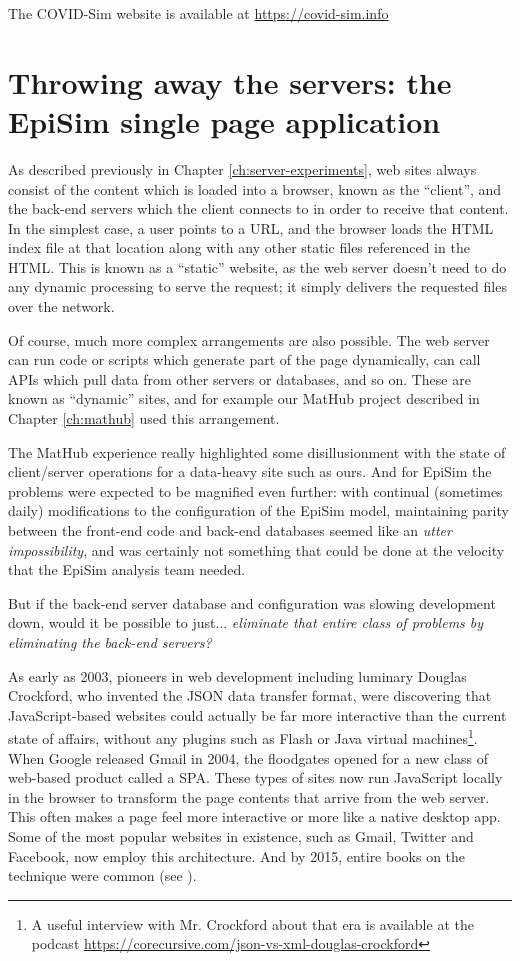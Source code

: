 The COVID-Sim website is available at \url{https://covid-sim.info}

\hypertarget{covid-throw-away-the-servers}{%
\section{Throwing away the servers: the EpiSim single page application}\label{covid-throw-away-the-servers}}

As described previously in Chapter \ref{ch:server-experiments}, web sites always consist of the content which is loaded into a browser, known as the ``client'', and the back-end servers which the client connects to in order to receive that content. In the simplest case, a user points to a URL, and the browser loads the HTML index file at that location along with any other static files referenced in the HTML. This is known as a ``static'' website, as the web server doesn't need to do any dynamic processing to serve the request; it simply delivers the requested files over the network.

Of course, much more complex arrangements are also possible. The web server can run code or scripts which generate part of the page dynamically, can call APIs which pull data from other servers or databases, and so on. These are known as ``dynamic'' sites, and for example our MatHub project described in Chapter \ref{ch:mathub} used this arrangement.

The MatHub experience really highlighted some disillusionment with the state of client/server operations for a data-heavy site such as ours. And for EpiSim the problems were expected to be magnified even further: with continual (sometimes daily) modifications to the configuration of the EpiSim model, maintaining parity between the front-end code and back-end databases seemed like an \emph{utter impossibility}, and was certainly not something that could be done at the velocity that the EpiSim analysis team needed.

But if the back-end server database and configuration was slowing development down, would it be possible to just... \emph{eliminate that entire class of problems by eliminating the back-end servers?}

As early as 2003, pioneers in web development including luminary Douglas Crockford, who invented the JSON data transfer format, were discovering that JavaScript-based websites could actually be far more interactive than the current state of affairs, without any plugins such as Flash or Java virtual machines\footnote{A useful interview with Mr. Crockford about that era is available at the podcast \url{https://corecursive.com/json-vs-xml-douglas-crockford}}. When Google released Gmail in 2004, the floodgates opened for a new class of web-based product called a \gls{SPA}. These types of sites now run JavaScript locally in the browser to transform the page contents that arrive from the web server. This often makes a page feel more interactive or more like a native desktop app. Some of the most popular websites in existence, such as Gmail, Twitter and Facebook, now employ this architecture. And by 2015, entire books on the technique were common (see \cite{Scott2015spa}).

